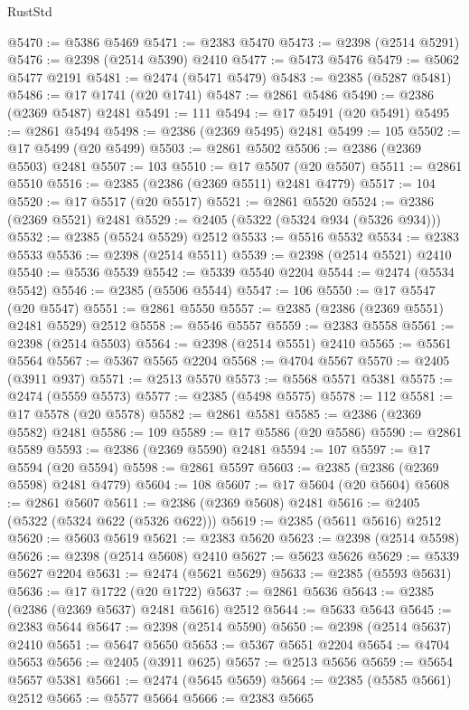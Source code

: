 \begin{lexlean}{RustStd}
\begin{coremodule}
@5470 := @5386 @5469
@5471 := @2383 @5470
@5473 := @2398 (@2514 @5291)
@5476 := @2398 (@2514 @5390) @2410
@5477 := @5473 @5476
@5479 := @5062 @5477 @2191
@5481 := @2474 (@5471 @5479)
@5483 := @2385 (@5287 @5481)
@5486 := @17 @1741 (@20 @1741)
@5487 := @2861 @5486
@5490 := @2386 (@2369 @5487) @2481
@5491 := 111
@5494 := @17 @5491 (@20 @5491)
@5495 := @2861 @5494
@5498 := @2386 (@2369 @5495) @2481
@5499 := 105
@5502 := @17 @5499 (@20 @5499)
@5503 := @2861 @5502
@5506 := @2386 (@2369 @5503) @2481
@5507 := 103
@5510 := @17 @5507 (@20 @5507)
@5511 := @2861 @5510
@5516 := @2385 (@2386 (@2369 @5511) @2481 @4779)
@5517 := 104
@5520 := @17 @5517 (@20 @5517)
@5521 := @2861 @5520
@5524 := @2386 (@2369 @5521) @2481
@5529 := @2405 (@5322 (@5324 @934 (@5326 @934)))
@5532 := @2385 (@5524 @5529) @2512
@5533 := @5516 @5532
@5534 := @2383 @5533
@5536 := @2398 (@2514 @5511)
@5539 := @2398 (@2514 @5521) @2410
@5540 := @5536 @5539
@5542 := @5339 @5540 @2204
@5544 := @2474 (@5534 @5542)
@5546 := @2385 (@5506 @5544)
@5547 := 106
@5550 := @17 @5547 (@20 @5547)
@5551 := @2861 @5550
@5557 := @2385 (@2386 (@2369 @5551) @2481 @5529) @2512
@5558 := @5546 @5557
@5559 := @2383 @5558
@5561 := @2398 (@2514 @5503)
@5564 := @2398 (@2514 @5551) @2410
@5565 := @5561 @5564
@5567 := @5367 @5565 @2204
@5568 := @4704 @5567
@5570 := @2405 (@3911 @937)
@5571 := @2513 @5570
@5573 := @5568 @5571 @5381
@5575 := @2474 (@5559 @5573)
@5577 := @2385 (@5498 @5575)
@5578 := 112
@5581 := @17 @5578 (@20 @5578)
@5582 := @2861 @5581
@5585 := @2386 (@2369 @5582) @2481
@5586 := 109
@5589 := @17 @5586 (@20 @5586)
@5590 := @2861 @5589
@5593 := @2386 (@2369 @5590) @2481
@5594 := 107
@5597 := @17 @5594 (@20 @5594)
@5598 := @2861 @5597
@5603 := @2385 (@2386 (@2369 @5598) @2481 @4779)
@5604 := 108
@5607 := @17 @5604 (@20 @5604)
@5608 := @2861 @5607
@5611 := @2386 (@2369 @5608) @2481
@5616 := @2405 (@5322 (@5324 @622 (@5326 @622)))
@5619 := @2385 (@5611 @5616) @2512
@5620 := @5603 @5619
@5621 := @2383 @5620
@5623 := @2398 (@2514 @5598)
@5626 := @2398 (@2514 @5608) @2410
@5627 := @5623 @5626
@5629 := @5339 @5627 @2204
@5631 := @2474 (@5621 @5629)
@5633 := @2385 (@5593 @5631)
@5636 := @17 @1722 (@20 @1722)
@5637 := @2861 @5636
@5643 := @2385 (@2386 (@2369 @5637) @2481 @5616) @2512
@5644 := @5633 @5643
@5645 := @2383 @5644
@5647 := @2398 (@2514 @5590)
@5650 := @2398 (@2514 @5637) @2410
@5651 := @5647 @5650
@5653 := @5367 @5651 @2204
@5654 := @4704 @5653
@5656 := @2405 (@3911 @625)
@5657 := @2513 @5656
@5659 := @5654 @5657 @5381
@5661 := @2474 (@5645 @5659)
@5664 := @2385 (@5585 @5661) @2512
@5665 := @5577 @5664
@5666 := @2383 @5665

\end{coremodule}
\end{lexlean}
